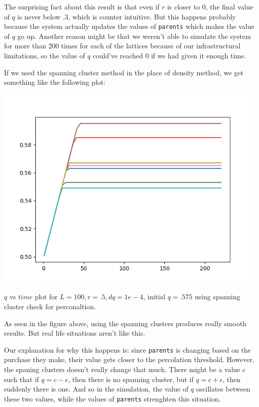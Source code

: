 \documentclass[article, 11pt, a4paper, onesize]{memoir}
\begin{document}
The surprising fact about this result is that even if \(r\) is closer to \(0\), the final
value of \(q\) is never below \(.3\), which is counter intuitive. But this happens
probably because the system actually updates the values of \texttt{parents} which makes
the value of \(q\) go up. Another reason might be that we weren't able to simulate the
system for more than \(200\) times for each of the lattices because of our infrastructural
limitations, so the value of \(q\) could've reached \(0\) if we had given it enough time.


If we used the spanning cluster method in the place of density method, we get something
like the following plot:

\begin{minipage}{.65\linewidth}
    \begin{center}
    \includegraphics[width=1\linewidth]{q_converges_spanning_L50_q575_r5_num10_dq1e-4.png}
    \end{center}
\end{minipage}\hfill%
\begin{minipage}{.34\linewidth}
    \(q\) vs \(time\) plot for \(L=100, r=.5, dq = 1e-4\), initial \(q = .575\) using
    spanning cluster check for perconaltion.
\end{minipage}

As seen in the figure above, using the spanning clusters produces really smooth results.
But real life situations aren't like this. 

Our explanation for why this happens is: since \texttt{parents} is changing based on the
purchase they make, their value gets closer to the percolation threshold. However, the
spaning clusters doesn't really change that much. There might be a value \(c\) such that
if \(q = c- \epsilon\), then there is no spanning cluster, but if \(q = c+\epsilon\), then
suddenly there is one. And so in the simulation, the value of \(q\) oscillates between
these two values, while the values of \texttt{parents} strenghten this situation.
\end{document}
